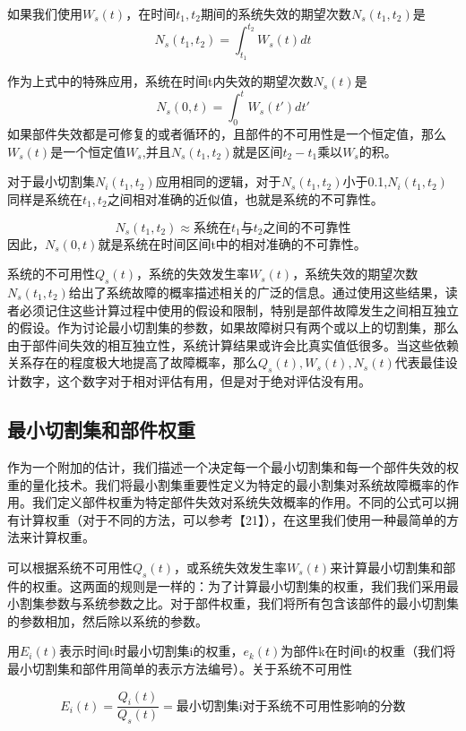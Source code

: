 \documentclass[cn,11pt,chinese]{elegantbook}
\begin{document}
{如果我们使用$W_s(t)$，在时间$t_1,t_2$期间的系统失效的期望次数$N_s(t_1,t_2)$是
\begin{equation}\label{eq11-36}
N_s(t_1,t_2) = \int_{t_1}^{t_2}W_s(t)dt
\end{equation}

作为上式中的特殊应用，系统在时间t内失效的期望次数$N_s(t)$是
$$N_s(0,t)=\int_0^t W_s(t')dt'$$
如果部件失效都是可修复的或者循环的，且部件的不可用性是一个恒定值，那么$W_s(t)$是一个恒定值$W_s$,并且$N_s(t_1,t_2)$就是区间$t_2-t_1$乘以$W_s$的积。


对于最小切割集$N_i(t_1,t_2)$应用相同的逻辑，对于$N_s(t_1,t_2)$小于0.1,$N_i(t_1,t_2)$同样是系统在$t_1,t_2$之间相对准确的近似值，也就是系统的不可靠性。

$$N_s(t_1,t_2) \approx \mbox{系统在}t_1\mbox{与}t_2\mbox{之间的不可靠性}$$
因此，$N_s(0,t)$就是系统在时间区间t中的相对准确的不可靠性。

系统的不可用性$Q_s(t)$，系统的失效发生率$W_s(t)$，系统失效的期望次数$N_s(t_1,t_2)$给出了系统故障的概率描述相关的广泛的信息。通过使用这些结果，读者必须记住这些计算过程中使用的假设和限制，特别是部件故障发生之间相互独立的假设。作为讨论最小切割集的参数，如果故障树只有两个或以上的切割集，那么由于部件间失效的相互独立性，系统计算结果或许会比真实值低很多。当这些依赖关系存在的程度极大地提高了故障概率，那么$Q_s(t),W_s(t),N_s(t)$代表最佳设计数字，这个数字对于相对评估有用，但是对于绝对评估没有用。

\subsection{最小切割集和部件权重}

作为一个附加的估计，我们描述一个决定每一个最小切割集和每一个部件失效的权重的量化技术。我们将最小割集重要性定义为特定的最小割集对系统故障概率的作用。我们定义部件权重为特定部件失效对系统失效概率的作用。不同的公式可以拥有计算权重（对于不同的方法，可以参考【21】），在这里我们使用一种最简单的方法来计算权重。

可以根据系统不可用性$Q_s(t)$，或系统失效发生率$W_s(t)$来计算最小切割集和部件的权重。这两面的规则是一样的：为了计算最小切割集的权重，我们我们采用最小割集参数与系统参数之比。对于部件权重，我们将所有包含该部件的最小切割集的参数相加，然后除以系统的参数。

用$E_i(t)$表示时间t时最小切割集i的权重，$e_k(t)$为部件k在时间t的权重（我们将最小切割集和部件用简单的表示方法编号）。关于系统不可用性

\begin{equation}\label{eq11-39}
E_i(t)=\frac{Q_i(t)}{Q_s(t)}= \mbox{最小切割集i对于系统不可用性影响的分数}
\end{equation}


}
\end{document}

